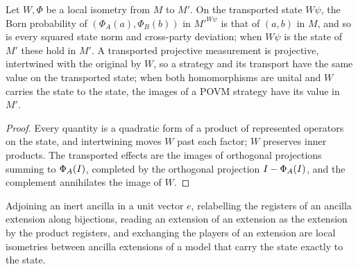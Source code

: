 \begin{lemma}
\label{lem:local-isometry}
\leanok
Let $W, \Phi$ be a local isometry from $M$ to $M'$. On the transported state $W\psi$, the Born
probability of $(\Phi_A(a), \Phi_B(b))$ in $M'^{W\psi}$ is that of $(a, b)$ in $M$, and so is every
squared state norm and cross-party deviation; when $W\psi$ is the state of $M'$ these hold in $M'$.
A transported projective measurement is projective, intertwined with the original by $W$, so a
strategy and its transport have the same value on the transported state; when both homomorphisms
are unital and $W$ carries the state to the state, the images of a POVM strategy have its value in
$M'$.
\end{lemma}

\begin{proof}
\leanok
Every quantity is a quadratic form of a product of represented operators on the state, and
intertwining moves $W$ past each factor; $W$ preserves inner products. The transported effects are
the images of orthogonal projections summing to $\Phi_A(I)$, completed by the orthogonal
projection $I - \Phi_A(I)$, and the complement annihilates the image of $W$.
\end{proof}

\begin{lemma}
\label{lem:ancilla-isometries}
\leanok
Adjoining an inert ancilla in a unit vector $e$, relabelling the registers of an ancilla extension
along bijections, reading an extension of an extension as the extension by the product registers,
and exchanging the players of an extension are local isometries between ancilla extensions of a
model that carry the state exactly to the state.
\end{lemma}

